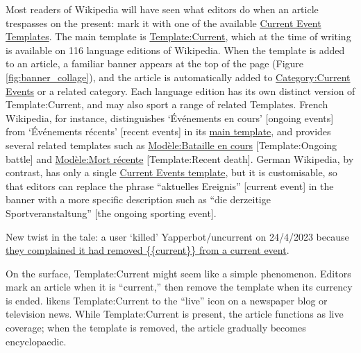 \documentclass[
  Crown,
  times,
  sageh]{sagej}
\begin{document}
Most readers of Wikipedia will have seen what editors do when an article
trespasses on the present: mark it with one of the available
\href{https://en.wikipedia.org/wiki/Wikipedia:Current_event_templates}{Current
Event Templates}. The main template is
\href{https://en.wikipedia.org/wiki/Template:Current}{Template:Current},
which at the time of writing is available on 116 language editions of
Wikipedia. When the template is added to an article, a familiar banner
appears at the top of the page (Figure \ref{fig:banner_collage}), and
the article is automatically added to
\href{https://en.wikipedia.org/wiki/Category:Current_events}{Category:Current
Events} or a related category. Each language edition has its own
distinct version of Template:Current, and may also sport a range of
related Templates. French Wikipedia, for instance, distinguishes
`Événements en cours' {[}ongoing events{]} from `Événements récents'
{[}recent events{]} in its
\href{https://fr.wikipedia.org/wiki/Mod\%C3\%A8le:\%C3\%89v\%C3\%A9nement_en_cours}{main
template}, and provides several related templates such as
\href{https://fr.wikipedia.org/wiki/Mod\%C3\%A8le:Bataille_en_cours}{Modèle:Bataille
en cours} {[}Template:Ongoing battle{]} and
\href{https://fr.wikipedia.org/wiki/Mod\%C3\%A8le:Mort_r\%C3\%A9cente}{Modèle:Mort
récente} {[}Template:Recent death{]}. German Wikipedia, by contrast, has
only a single
\href{https://de.wikipedia.org/wiki/Vorlage:Laufendes_Ereignis}{Current
Events template}, but it is customisable, so that editors can replace
the phrase ``aktuelles Ereignis'' {[}current event{]} in the banner with
a more specific description such as ``die derzeitige
Sportveranstaltung'' {[}the ongoing sporting event{]}.

New twist in the tale: a user `killed' Yapperbot/uncurrent on 24/4/2023
because
\href{https://en.wikipedia.org/w/index.php?diff=1151461527&oldid=986550108&title=User\%3AYapperbot\%2Fkill\%2FUncurrenter}{they
complained it had removed \{\{current\}\} from a current event}.

On the surface, Template:Current might seem like a simple phenomenon.
Editors mark an article when it is ``current,'' then remove the template
when its currency is ended. \citet{avieson_breaking_2019} likens
Template:Current to the ``live'' icon on a newspaper blog or television
news. While Template:Current is present, the article functions as live
coverage; when the template is removed, the article gradually becomes
encyclopaedic.
\end{document}
